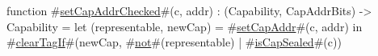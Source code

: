 function #\hyperref[sailRISCVzsetCapAddrChecked]{setCapAddrChecked}#(c, addr) : (Capability, CapAddrBits) -> Capability =
    let (representable, newCap) = #\hyperref[sailRISCVzsetCapAddr]{setCapAddr}#(c, addr) in
    #\hyperref[sailRISCVzclearTagIf]{clearTagIf}#(newCap, #\hyperref[sailRISCVznot]{not}#(representable) | #\hyperref[sailRISCVzisCapSealed]{isCapSealed}#(c))
